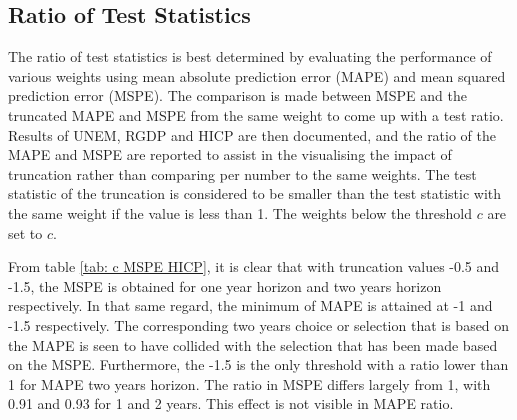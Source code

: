 \documentclass[11pt]{article}
\begin{document}
\subsection{Ratio of Test Statistics}\label{ratio-of-test-statistics}
The ratio of test statistics is best determined by evaluating the performance of various weights using mean absolute prediction error (MAPE) and mean squared prediction error (MSPE). The comparison is made between MSPE and the truncated MAPE and MSPE from the same weight to come up with a test ratio. Results of UNEM, RGDP and HICP are then documented, and the ratio of the MAPE and MSPE are reported to assist in the visualising the impact of truncation rather than comparing per number to the same weights. The test statistic of the truncation is considered to be smaller than the test statistic with the same weight if the value is less than 1. The weights below the threshold $c$ are set to $c$.

From table \ref{tab: c MSPE HICP}, it is clear that with truncation values -0.5 and -1.5, the MSPE is obtained for one year horizon and two years horizon respectively. In that same regard, the minimum of MAPE is attained at -1 and -1.5 respectively. The corresponding two years choice or selection that is based on the MAPE is seen to have collided with the selection that has been made based on the MSPE. Furthermore, the -1.5 is the only threshold with a ratio lower than 1 for MAPE two years horizon. The ratio in MSPE differs largely from 1, with 0.91 and 0.93 for 1 and 2 years. This effect is not visible in MAPE ratio.
\end{document}
